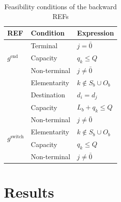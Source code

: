 \documentclass[preprint,11pt,authoryear]{elsarticle}
\begin{document}
\begin{table}[!ht]
\caption{Feasibility conditions of the backward REFs}
\label{tab:backward-feasibility}
\footnotesize
\renewcommand{\arraystretch}{1.5}
\setlength{\tabcolsep}{6pt}
\begin{tabularx}{\linewidth}{@{}l l X@{}}
\toprule
REF & Condition & Expression \\
\midrule

\multirow{3}{*}{$g^{\mathrm{end}}$}
& Terminal & $j = \bar 0$ \\
& Capacity & $q_k \leq Q$ \\
\midrule

\multirow{5}{*}{$g^{\mathrm{extend}}$}
& Non-terminal & $j \neq \bar 0$ \\
& Elementarity & $k \notin S_b \cup O_b$ \\
& Destination & $d_i = d_j$ \\
& Capacity & $L_b + q_k \leq Q$ \\
\midrule

\multirow{4}{*}{$g^{\mathrm{switch}}$}
& Non-terminal & $j \neq \bar 0$ \\
& Elementarity & $k \notin S_b \cup O_b$ \\
& Capacity & $q_k \leq Q$ \\
\midrule

$g^{\mathrm{start}}$
& Non-terminal & $j \neq \bar 0$ \\

\bottomrule
\end{tabularx}
\end{table}


\newpage




\section{Results}
\end{document}
